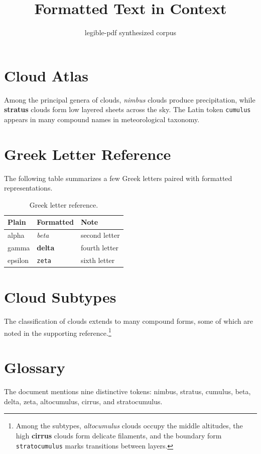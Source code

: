 \documentclass[12pt]{article}
\title{Formatted Text in Context}
\author{legible-pdf synthesized corpus}
\date{}
\begin{document}
\maketitle

\section{Cloud Atlas}

Among the principal genera of clouds, \textit{nimbus} clouds produce
precipitation, while \textbf{stratus} clouds form low layered sheets across
the sky. The Latin token \texttt{cumulus} appears in many compound names
in meteorological taxonomy.

\section{Greek Letter Reference}

The following table summarizes a few Greek letters paired with formatted
representations.

\begin{table}[h]
\centering
\begin{tabular}{|l|l|l|}
\hline
Plain & Formatted & Note \\
\hline
alpha & \textit{beta} & second letter \\
gamma & \textbf{delta} & fourth letter \\
epsilon & \texttt{zeta} & sixth letter \\
\hline
\end{tabular}
\caption{Greek letter reference.}
\end{table}

\section{Cloud Subtypes}

The classification of clouds extends to many compound forms, some of which
are noted in the supporting reference.\footnote{Among the subtypes,
\textit{altocumulus} clouds occupy the middle altitudes, the high
\textbf{cirrus} clouds form delicate filaments, and the boundary form
\texttt{stratocumulus} marks transitions between layers.}

\section{Glossary}

The document mentions nine distinctive tokens: nimbus, stratus, cumulus,
beta, delta, zeta, altocumulus, cirrus, and stratocumulus.
\end{document}
